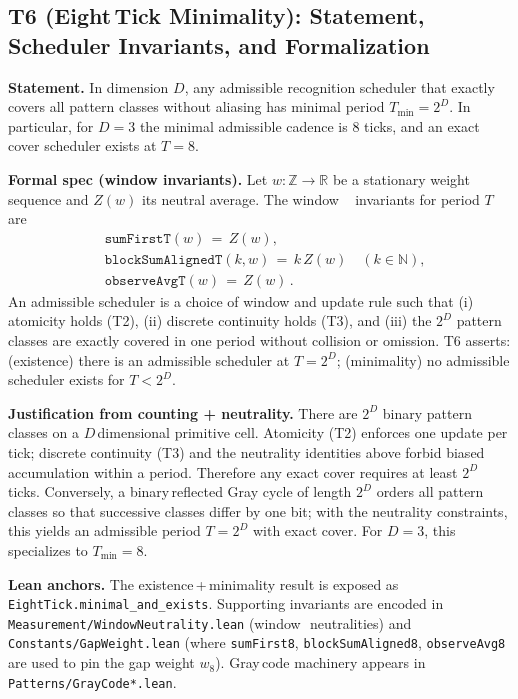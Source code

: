 \documentclass[11pt]{article}
\begin{document}
\subsection*{T6 (Eight\,Tick Minimality): Statement, Scheduler Invariants, and Formalization}
\textbf{Statement.} In dimension $D$, any admissible recognition scheduler that exactly covers all pattern classes without aliasing has minimal period $T_{\min}=2^D$. In particular, for $D{=}3$ the minimal admissible cadence is $8$ ticks, and an exact\,cover scheduler exists at $T=8$.

\medskip
\textbf{Formal spec (window invariants).} Let $w:\mathbb Z\to\mathbb R$ be a stationary weight sequence and $Z(w)$ its neutral average. The window\,\,\,\,\, invariants for period $T$ are
\begin{align*}
  &\texttt{sumFirstT}(w) \,=\, Z(w),\\
  &\texttt{blockSumAlignedT}(k, w) \,=\, k\,Z(w)\quad (k\in\mathbb N),\\
  &\texttt{observeAvgT}(w) \,=\, Z(w)\,.
\end{align*}
An admissible scheduler is a choice of window and update rule such that (i) atomicity holds (T2), (ii) discrete continuity holds (T3), and (iii) the $2^D$ pattern classes are exactly covered in one period without collision or omission. T6 asserts: (existence) there is an admissible scheduler at $T=2^D$; (minimality) no admissible scheduler exists for $T<2^D$.

\textbf{Justification from counting + neutrality.} There are $2^D$ binary pattern classes on a $D$\,dimensional primitive cell. Atomicity (T2) enforces one update per tick; discrete continuity (T3) and the neutrality identities above forbid biased accumulation within a period. Therefore any exact cover requires at least $2^D$ ticks. Conversely, a binary\,reflected Gray cycle of length $2^D$ orders all pattern classes so that successive classes differ by one bit; with the neutrality constraints, this yields an admissible period $T=2^D$ with exact cover. For $D{=}3$, this specializes to $T_{\min}=8$.

\textbf{Lean anchors.} The existence\,+\,minimality result is exposed as \texttt{EightTick.minimal\_and\_exists}. Supporting invariants are encoded in \texttt{Measurement/WindowNeutrality.lean} (window\,\, neutralities) and \texttt{Constants/GapWeight.lean} (where \texttt{sumFirst8}, \texttt{blockSumAligned8}, \texttt{observeAvg8} are used to pin the gap weight $w_8$). Gray\,code machinery appears in \texttt{Patterns/GrayCode*.lean}.
\end{document}
